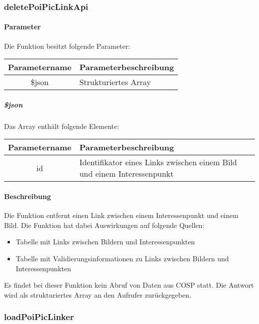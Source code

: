 \subsubsection{deletePoiPicLinkApi}
\paragraph{Parameter} Die Funktion besitzt folgende Parameter:
\begin{table}[H]
	\begin{tabular}{|c|p{11cm}|}
		\hline
		\textbf{Parametername} & \textbf{Parameterbeschreibung} \\ \hline
		\$json & Strukturiertes Array \\ \hline
	\end{tabular}
\end{table}
\subparagraph{\$json}Das Array enthält folgende Elemente:
\begin{table}[H]
	\begin{tabular}{|c|p{11cm}|}
		\hline
		\textbf{Parametername} & \textbf{Parameterbeschreibung} \\ \hline
		id   & Identifikator eines Links zwischen einem Bild und einem Interessenpunkt \\ \hline
	\end{tabular}
\end{table}
\paragraph{Beschreibung} Die Funktion entfernt einen Link zwischen einem Interessenpunkt und einem Bild. Die Funktion hat dabei Auswirkungen auf folgende Quellen:
\begin{itemize}
	\item Tabelle mit Links zwischen Bildern und Interessenpunkten
	\item Tabelle mit Validierungsinformationen zu Links zwischen Bildern und Interessenpunkten
\end{itemize}
Es findet bei dieser Funktion kein Abruf von Daten aus {\glqq COSP\grqq} statt. Die Antwort wird als strukturiertes Array an den Aufrufer zurückgegeben.
\subsubsection{loadPoiPicLinker}
